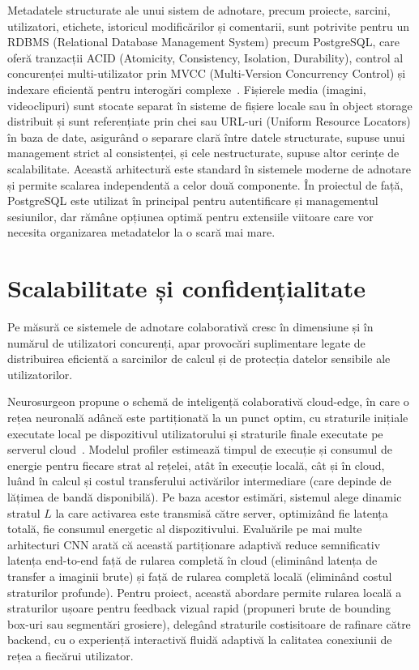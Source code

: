 Metadatele structurate ale unui sistem de adnotare, precum proiecte, sarcini, utilizatori, etichete, istoricul modificărilor și comentarii, sunt potrivite pentru un RDBMS (Relational Database Management System) precum PostgreSQL, care oferă tranzacții ACID (Atomicity, Consistency, Isolation, Durability), control al concurenței multi-utilizator prin MVCC (Multi-Version Concurrency Control) și indexare eficientă pentru interogări complexe~\cite{postgresql_docs}. Fișierele media (imagini, videoclipuri) sunt stocate separat în sisteme de fișiere locale sau în object storage distribuit și sunt referențiate prin chei sau URL-uri (Uniform Resource Locators) în baza de date, asigurând o separare clară între datele structurate, supuse unui management strict al consistenței, și cele nestructurate, supuse altor cerințe de scalabilitate. Această arhitectură este standard în sistemele moderne de adnotare și permite scalarea independentă a celor două componente. În proiectul de față, PostgreSQL este utilizat în principal pentru autentificare și managementul sesiunilor, dar rămâne opțiunea optimă pentru extensiile viitoare care vor necesita organizarea metadatelor la o scară mai mare.

\section{Scalabilitate și confidențialitate}

Pe măsură ce sistemele de adnotare colaborativă cresc în dimensiune și în numărul de utilizatori concurenți, apar provocări suplimentare legate de distribuirea eficientă a sarcinilor de calcul și de protecția datelor sensibile ale utilizatorilor.

Neurosurgeon propune o schemă de inteligență colaborativă cloud-edge, în care o rețea neuronală adâncă este partiționată la un punct optim, cu straturile inițiale executate local pe dispozitivul utilizatorului și straturile finale executate pe serverul cloud~\cite{10.1145/3037697.3037698}. Modelul profiler estimează timpul de execuție și consumul de energie pentru fiecare strat al rețelei, atât în execuție locală, cât și în cloud, luând în calcul și costul transferului activărilor intermediare (care depinde de lățimea de bandă disponibilă). Pe baza acestor estimări, sistemul alege dinamic stratul $L$ la care activarea este transmisă către server, optimizând fie latența totală, fie consumul energetic al dispozitivului. Evaluările pe mai multe arhitecturi CNN arată că această partiționare adaptivă reduce semnificativ latența end-to-end față de rularea completă în cloud (eliminând latența de transfer a imaginii brute) și față de rularea completă locală (eliminând costul straturilor profunde). Pentru proiect, această abordare permite rularea locală a straturilor ușoare pentru feedback vizual rapid (propuneri brute de bounding box-uri sau segmentări grosiere), delegând straturile costisitoare de rafinare către backend, cu o experiență interactivă fluidă adaptivă la calitatea conexiunii de rețea a fiecărui utilizator.

